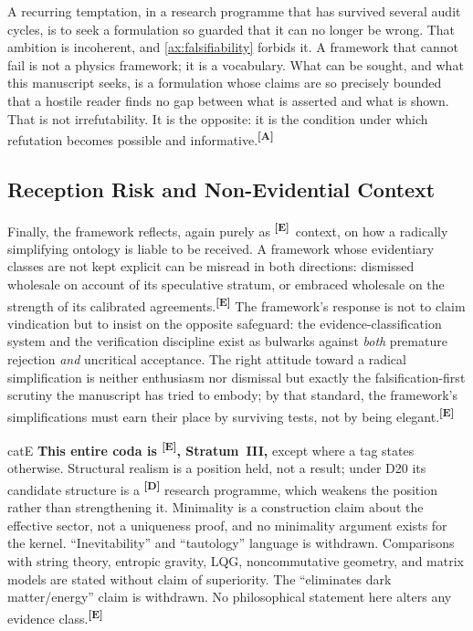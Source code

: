 \documentclass[12pt,a4paper,twoside]{article}
\theoremstyle{plain}
\theoremstyle{definition}
\theoremstyle{remark}
\newcommand{\catmark}[1]{\textsuperscript{\textsf{\textbf{[#1]}}}}
\begin{document}
\begin{governancebox}
\label{gov:irrefutable}
A recurring temptation, in a research programme that has survived several
audit cycles, is to seek a formulation so guarded that it can no longer
be wrong. That ambition is incoherent, and \cref{ax:falsifiability}
forbids it. A framework that cannot fail is not a physics framework; it
is a vocabulary. What can be sought, and what this manuscript seeks, is a
formulation whose claims are so precisely bounded that a hostile reader
finds no gap between what is asserted and what is shown. That is not
irrefutability. It is the opposite: it is the condition under which
refutation becomes possible and informative.\catmark{A}
\end{governancebox}

\subsection{Reception Risk and Non-Evidential Context}
\label{subsec:sociology}

Finally, the framework reflects, again purely as \catmark{E}\ context, on
how a radically simplifying ontology is liable to be received. A
framework whose evidentiary classes are not kept explicit can be misread
in both directions: dismissed wholesale on account of its speculative
stratum, or embraced wholesale on the strength of its calibrated
agreements.\catmark{E} The framework's response is not to claim
vindication but to insist on the opposite safeguard: the
evidence-classification system and the verification discipline exist as
bulwarks against \emph{both} premature rejection \emph{and} uncritical
acceptance. The right attitude toward a radical simplification is neither
enthusiasm nor dismissal but exactly the falsification-first scrutiny the
manuscript has tried to embody; by that standard, the framework's
simplifications must earn their place by surviving tests, not by being
elegant.\catmark{E}

\begin{evidencebox}{catE}
\textbf{This entire coda is \catmark{E}, Stratum~III,} except where a
tag states otherwise. Structural realism is a position held, not a
result; under D20 its candidate structure is a \catmark{D} research
programme, which weakens the position rather than strengthening it.
Minimality is a construction claim about the effective sector, not a
uniqueness proof, and no minimality argument exists for the kernel.
``Inevitability'' and ``tautology'' language is withdrawn. Comparisons
with string theory, entropic gravity, LQG, noncommutative geometry, and
matrix models are stated without claim of superiority. The ``eliminates
dark matter/energy'' claim is withdrawn. No philosophical statement here
alters any evidence class.\catmark{E}
\end{evidencebox}
\end{document}
